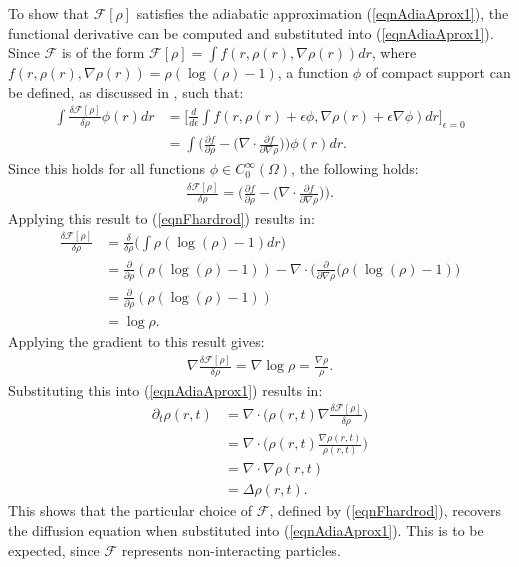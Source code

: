 To show that $\mathcal{F}[\rho]$ satisfies the adiabatic approximation (\ref{eqnAdiaAprox1}), the functional derivative can be computed and substituted into (\ref{eqnAdiaAprox1}). 
Since $\mathcal{F}$ is of the form $\mathcal{F}[\rho] = \int f(r,\rho(r), \nabla \rho(r))dr$, where $f(r,\rho(r), \nabla \rho(r))= \rho(\log(\rho)-1)$, a function $\phi$ of compact support can be defined, as discussed in \cite{CalculusofVariations1}, such that:
\begin{align*}
\int \frac{\delta \mathcal{F}[\rho]}{\delta \rho} \phi(r) dr &= \bigg[ \frac{d}{d \epsilon} \int f(r,\rho(r) + \epsilon \phi, \nabla \rho(r) + \epsilon \nabla \phi) dr \bigg]_{\epsilon=0}\\
&= \int \bigg( \frac{\partial f}{ \partial \rho} - \bigg( \nabla \cdot \frac{\partial f}{\partial \nabla \rho} \bigg) \bigg) \phi(r) dr.
\end{align*}
Since this holds for all functions $\phi \in C_0^\infty (\Omega)$, the following holds:
\begin{align*}
\frac{\delta \mathcal{F}[\rho]}{\delta \rho} =\bigg( \frac{\partial f}{ \partial \rho} - \bigg( \nabla \cdot \frac{\partial f}{\partial \nabla \rho} \bigg) \bigg).
\end{align*}
Applying this result to (\ref{eqnFhardrod}) results in:
\begin{align*}
\frac{\delta \mathcal{F}[\rho]}{\delta \rho} &= \frac{\delta}{\delta \rho} \bigg(\int \rho(\log(\rho)-1) dr \bigg)\\
&=  \frac{\partial}{ \partial \rho}(\rho(\log(\rho)-1)) - \nabla \cdot \bigg(\frac{\partial}{\partial \nabla \rho} (\rho(\log(\rho)-1) \bigg)\\
&=  \frac{\partial}{ \partial \rho}(\rho(\log(\rho)-1))\\
&= \log \rho. 
\end{align*}
Applying the gradient to this result gives:
\begin{align*}
\nabla \frac{\delta \mathcal{F}[\rho]}{\delta \rho} = \nabla \log \rho = \frac{\nabla \rho}{\rho}.
\end{align*}
Substituting this into (\ref{eqnAdiaAprox1}) results in:
\begin{align*}
\partial_t \rho(r,t) &= \nabla \cdot \bigg( \rho(r,t) \nabla \frac{\delta \mathcal{F[\rho]}}{\delta \rho} \bigg)\\
&= \nabla \cdot \bigg( \rho(r,t)  \frac{\nabla \rho(r,t) }{\rho(r,t)}  \bigg)\\
&= \nabla \cdot \nabla \rho(r,t) \\
&= \Delta \rho(r,t).
\end{align*}
This shows that the particular choice of $\mathcal{F}$, defined by (\ref{eqnFhardrod}), recovers the diffusion equation when substituted into (\ref{eqnAdiaAprox1}). This is to be expected, since $\mathcal{F}$ represents non-interacting particles.

